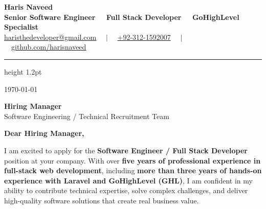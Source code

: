 \documentclass[11pt,letterpaper]{article}
\begin{document}
\newcommand{\yourName}{Haris Naveed}
\newcommand{\yourField}{Senior Software Engineer \ \textbullet\ Full Stack Developer \ \textbullet\ GoHighLevel Specialist}
\newcommand{\yourWebsite}{https://github.com/harisnaveed}
\newcommand{\yourEmail}{haristhedeveloper@gmail.com}
\newcommand{\yourPhone}{+92-312-1592007}

\begin{center}
    {\Huge\bfseries\color{primary} \yourName} \\[4pt]
    {\large\bfseries\color{secondary} \yourField} \\[5pt]
    {\small 
      \href{mailto:\yourEmail}{\color{accent}\underline{\yourEmail}} \ \ $|$ \ \ 
      \href{tel:\yourPhone}{\color{secondary}\yourPhone} \ \ $|$ \ \ 
      \href{\yourWebsite}{\color{accent}\underline{github.com/harisnaveed}}
    }
\end{center}
\vspace{4pt}
{\color{primary}\hrule height 1.2pt}
\vspace{16pt}

\noindent\textcolor{secondary}{\today}

\vspace{12pt}

\noindent\textbf{\color{primary}Hiring Manager} \\
\textcolor{secondary}{Software Engineering / Technical Recruitment Team}

\vspace{16pt}

\noindent\textbf{Dear Hiring Manager,}

\vspace{10pt}

I am excited to apply for the \textbf{Software Engineer / Full Stack Developer} position at your company. With over \textbf{five years of professional experience in full-stack web development}, including \textbf{more than three years of hands-on experience with Laravel and GoHighLevel (GHL)}, I am confident in my ability to contribute technical expertise, solve complex challenges, and deliver high-quality software solutions that create real business value.
\end{document}
